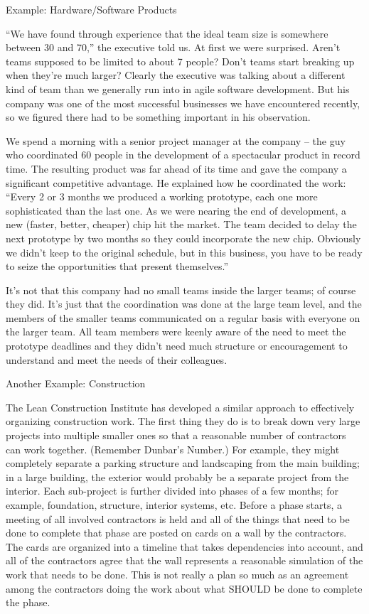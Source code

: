 Example: Hardware/Software Products

``We have found through experience that the ideal team size is somewhere between 30 and 70,” the executive told us. At first we were surprised. Aren’t teams supposed to be limited to about 7 people? Don’t teams start breaking up when they’re much larger? Clearly the executive was talking about a different kind of team than we generally run into in agile software development. But his company was one of the most successful businesses we have encountered recently, so we figured there had to be something important in his observation.

We spend a morning with a senior project manager at the company – the guy who coordinated 60 people in the development of a spectacular product in record time. The resulting product was far ahead of its time and gave the company a significant competitive advantage. He explained how he coordinated the work: “Every 2 or 3 months we produced a working prototype, each one more sophisticated than the last one. As we were nearing the end of development, a new (faster, better, cheaper) chip hit the market. The team decided to delay the next prototype by two months so they could incorporate the new chip. Obviously we didn’t keep to the original schedule, but in this business, you have to be ready to seize the opportunities that present themselves.''

It’s not that this company had no small teams inside the larger teams; of course they did. It’s just that the coordination was done at the large team level, and the members of the smaller teams communicated on a regular basis with everyone on the larger team. All team members were keenly aware of the need to meet the prototype deadlines and they didn’t need much structure or encouragement to understand and meet the needs of their colleagues.

Another Example: Construction

The Lean Construction Institute has developed a similar approach to effectively organizing construction work. The first thing they do is to break down very large projects into multiple smaller ones so that a reasonable number of contractors can work together. (Remember Dunbar’s Number.) For example, they might completely separate a parking structure and landscaping from the main building; in a large building, the exterior would probably be a separate project from the interior. Each sub-project is further divided into phases of a few months; for example, foundation, structure, interior systems, etc. Before a phase starts, a meeting of all involved contractors is held and all of the things that need to be done to complete that phase are posted on cards on a wall by the contractors. The cards are organized into a timeline that takes dependencies into account, and all of the contractors agree that the wall represents a reasonable simulation of the work that needs to be done. This is not really a plan so much as an agreement among the contractors doing the work about what SHOULD be done to complete the phase.

